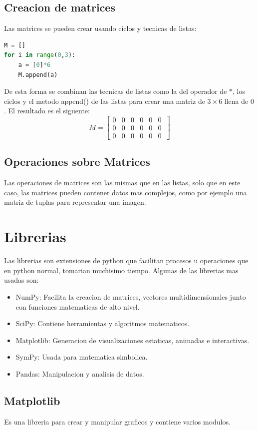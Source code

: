 \documentclass{article}
\begin{document}
\subsection{Creacion de matrices}
Las matrices se pueden crear usando ciclos y tecnicas de listas:
\begin{lstlisting}[language=Python, caption= Matriz en python con ciclos]
M = []
for i in range(0,3):
    a = [0]*6
    M.append(a)
\end{lstlisting}
De esta forma se combinan las tecnicas de listas como la del operador de \(*\), los ciclos y el metodo append() de las listas para crear una matriz de \(3 \times 6\) llena de \(0\). El resultado es el siguente:
\[
M = 
\begin{bmatrix}
    0 & 0 & 0 & 0 & 0 & 0\\
    0 & 0 & 0 & 0 & 0 & 0\\
    0 & 0 & 0 & 0 & 0 & 0\
\end{bmatrix}
\]
\subsection{Operaciones sobre Matrices}
Las operaciones de matrices son las mismas que en las listas, solo que en este caso, las matrices pueden contener datos mas complejos, como por ejemplo una matriz de tuplas para representar una imagen. 
\section{Librerias}
Las librerias son extensiones de python que facilitan procesos u operaciones que en python normal, tomarian muchisimo tiempo. Algunas de las librerias mas usadas son:
\begin{itemize}
    \item NumPy: Facilita la creacion de matrices, vectores multidimensionales junto con funciones matematicas de alto nivel.
    \item SciPy: Contiene herramientas y algoritmos matematicos.
    \item Matplotlib: Generacion de visualizaciones estaticas, animadas e interactivas.
    \item SymPy: Usada para matematica simbolica.
    \item Pandas: Manipulacion y analisis de datos.
\end{itemize}
\subsection{Matplotlib}
Es una libreria para crear y manipular graficos y contiene varios modulos.
\end{document}
